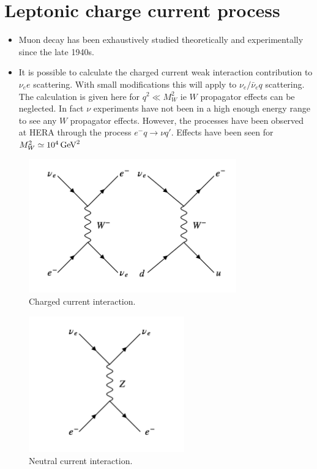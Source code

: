\section{Leptonic charge current process}

\begin{itemize}
  \item Muon decay has been exhaustively studied theoretically and experimentally since the late 1940s.
  \item It is possible to calculate the charged current weak interaction contribution to $\nu_e e$ scattering.  With small modifications this will apply to $\nu_e / \bar{\nu}_e q$ scattering.  The calculation is given here for $q^2 \ll M_W^2$ ie $W$ propagator effects can be neglected.  In fact $\nu$ experiments have not been in a high enough energy range to see any $W$ propagator effects.  However, the processes have been observed at HERA through the process $e^- q \to \nu q'$.  Effects have been seen for $M_W^2 \simeq 10^4 \mathrm{\,GeV}^2$
\end{itemize}

\begin{figure}[!htb]
  \begin{center}
    \includegraphics[width=0.8\textwidth]{images/web_feynman/image_44.png}
    \caption[Charged current interaction]{Charged current interaction.}
    \label{fig:ch12_chargedCurrentInteraction}
  \end{center}
\end{figure}

\begin{figure}[!htb]
  \begin{center}
    \includegraphics[width=0.6\textwidth]{images/web_feynman/image_45.png}
    \caption[Neutral current interaction]{Neutral current interaction.}
    \label{fig:ch12_neutralCurrentInteraction}
  \end{center}
\end{figure}

